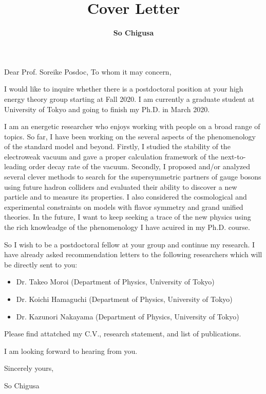 \documentclass[12pt,notitlepage]{article}
\title{\vspace*{-3cm}Cover Letter}
\author{\textbf{So Chigusa}}
\date{}
\def\professorname{Soreike Posdoc}
\begin{document}
\maketitle
\thispagestyle{empty}

\ifthenelse{\isundefined{\noprofessorname}}
{Dear Prof. \professorname,}
{To whom it may concern,}

\vspace{5mm}
I would like to inquire whether there is a postdoctoral position at your high energy theory group starting at Fall 2020.
I am currently a graduate student at University of Tokyo and going to finish my Ph.D. in March 2020.

I am an energetic researcher who enjoys working with people on a broad range of topics.
So far, I have been working on the several aspects of the phenomenology of the standard model and beyond.
Firstly, I studied the stability of the electroweak vacuum and gave a proper calculation framework of the next-to-leading order decay rate of the vacuum.
Secondly, I proposed and/or analyzed several clever methods to search for the supersymmetric partners of gauge bosons using future hadron colliders and evaluated their ability to discover a new particle and to measure its properties.
I also considered the cosmological and experimental constraints on models with flavor symmetry and grand unified theories.
In the future, I want to keep seeking a trace of the new physics using the rich knowleadge of the phenomenology I have acuired in my Ph.D. course.

So I wish to be a postdoctoral fellow at your group and continue my research.
I have already asked recommendation letters to the following researchers which will be directly sent to you:
\vspace{-2mm}
\begin{itemize}
  \setlength{\parskip}{1mm}
  \setlength{\itemsep}{0cm}
  \item Dr. Takeo Moroi (Department of Physics, University of Tokyo)
  \item Dr. Koichi Hamaguchi (Department of Physics, University of Tokyo)
  \item Dr. Kazunori Nakayama (Department of Physics, University of Tokyo)
\end{itemize}
\vspace{-2mm}
Please find attatched my C.V., research statement, and list of publications.

I am looking forward to hearing from you.

\vspace{5mm}
Sincerely yours,

\vspace{5mm}
So Chigusa
\end{document}
